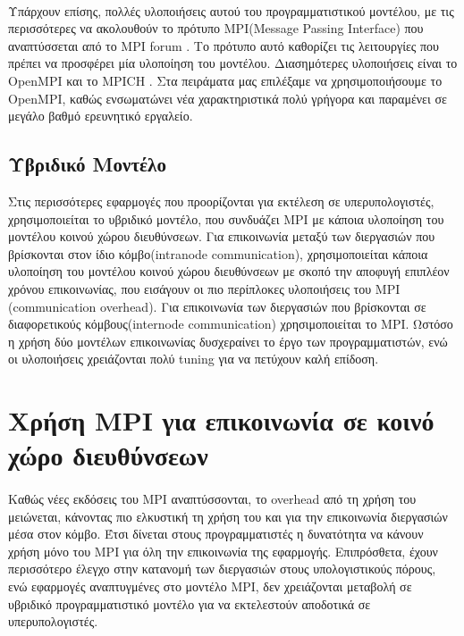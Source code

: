 \paragraph{}
Υπάρχουν επίσης, πολλές υλοποιήσεις αυτού του προγραμματιστικού μοντέλου, με τις περισσότερες να ακολουθούν το πρότυπο MPI(Message Passing Interface) που αναπτύσσεται από το MPI forum \cite{MPI}. Το πρότυπο αυτό καθορίζει τις λειτουργίες που πρέπει να προσφέρει μία υλοποίηση του μοντέλου. Διασημότερες υλοποιήσεις είναι το OpenMPI \cite{OMPI} και το MPICH \cite{MPICH}. Στα πειράματα μας επιλέξαμε να χρησιμοποιήσουμε το OpenMPI, καθώς ενσωματώνει νέα χαρακτηριστικά πολύ γρήγορα και παραμένει σε μεγάλο βαθμό ερευνητικό εργαλείο.
\subsection{Υβριδικό Μοντέλο}
Στις περισσότερες εφαρμογές που προορίζονται για εκτέλεση σε υπερυπολογιστές, χρησιμοποιείται το υβριδικό μοντέλο, που συνδυάζει MPI με κάποια υλοποίηση του μοντέλου κοινού χώρου διευθύνσεων. Για επικοινωνία μεταξύ των διεργασιών που βρίσκονται στον ίδιο κόμβο(intranode communication), χρησιμοποιείται κάποια υλοποίηση του μοντέλου κοινού χώρου διευθύνσεων με σκοπό την αποφυγή επιπλέον χρόνου επικοινωνίας,  που εισάγουν οι πιο περίπλοκες υλοποιήσεις του MPI (communication overhead). Για επικοινωνία των διεργασιών που βρίσκονται σε διαφορετικούς κόμβους(internode communication) χρησιμοποιείται το MPI. Ωστόσο η χρήση δύο μοντέλων επικοινωνίας δυσχεραίνει το έργο των προγραμματιστών, ενώ οι υλοποιήσεις χρειάζονται πολύ tuning για να πετύχουν καλή επίδοση.


\section{Χρήση MPI για επικοινωνία σε κοινό χώρο διευθύνσεων}

\paragraph{}
Καθώς νέες εκδόσεις του MPI αναπτύσσονται, το overhead από τη χρήση του μειώνεται, κάνοντας πιο ελκυστική τη χρήση του και για την επικοινωνία διεργασιών μέσα στον κόμβο. Έτσι δίνεται στους προγραμματιστές η δυνατότητα να κάνουν χρήση μόνο του MPI για όλη την επικοινωνία της εφαρμογής. Επιπρόσθετα, έχουν περισσότερο έλεγχο στην κατανομή των διεργασιών στους υπολογιστικούς πόρους, ενώ εφαρμογές αναπτυγμένες στο μοντέλο MPI, δεν χρειάζονται μεταβολή σε υβριδικό προγραμματιστικό μοντέλο για να εκτελεστούν αποδοτικά σε υπερυπολογιστές. 


